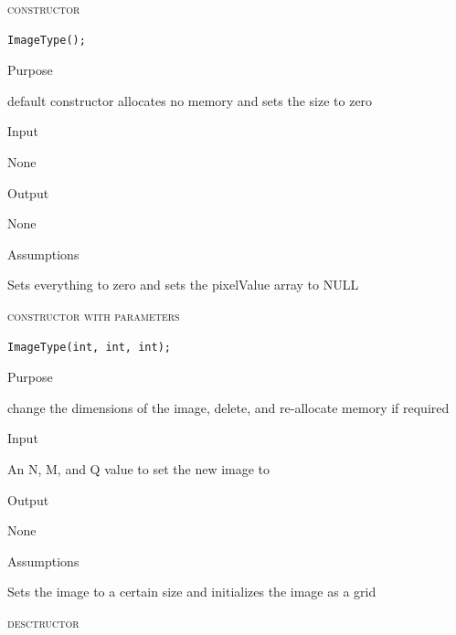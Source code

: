 \documentclass[pdftex, 11pt]{article}
\begin{document}
\begin{description}

	\item{\textsc{constructor}}
		\begin{description}

\begin{lstlisting}
ImageType();
\end{lstlisting}

			\item{Purpose}

				default constructor allocates no memory and sets the size to zero 

			\item{Input}

				None

			\item{Output}

				None

			\item{Assumptions}

				Sets everything to zero and 
				sets the pixelValue array to NULL


		\end{description}


	\item{\textsc{constructor with parameters}}
		\begin{description}

\begin{lstlisting}
ImageType(int, int, int);
\end{lstlisting}

			\item{Purpose}

				change the dimensions of the image, delete,
				and re-allocate memory if required

			\item{Input}

				An N, M, and Q value to set the new image to

			\item{Output}

				None

			\item{Assumptions}

				Sets the image to a certain size and initializes the
				image as a grid

		\end{description}



	\item{\textsc{desctructor}}
		\begin{description}


\end{description}
\end{description}
\end{document}
